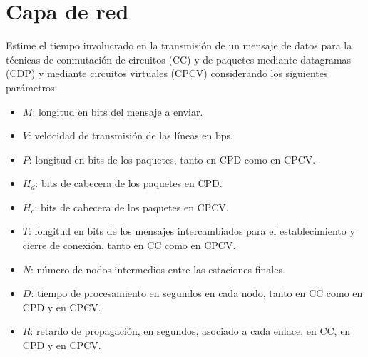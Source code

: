 \section{Capa de red}

\begin{ejercicio}
    Estime el tiempo involucrado en la transmisión de un mensaje de datos para la técnicas de conmutación de circuitos (CC) y de paquetes mediante datagramas (CDP) y mediante circuitos virtuales (CPCV) considerando los siguientes parámetros:
    \begin{itemize}
        \item $M$: longitud en bits del mensaje a enviar.
        \item $V$: velocidad de transmisión de las líneas en bps.
        \item $P$: longitud en bits de los paquetes, tanto en CPD como en CPCV\@.
        \item $H_d$: bits de cabecera de los paquetes en CPD\@.
        \item $H_c$: bits de cabecera de los paquetes en CPCV\@.
        \item $T$: longitud en bits de los mensajes intercambiados para el establecimiento y cierre de conexión, tanto en CC como en CPCV\@.
        \item $N$: número de nodos intermedios entre las estaciones finales.
        \item $D$: tiempo de procesamiento en segundos en cada nodo, tanto en CC como en CPD y en CPCV\@.
        \item $R$: retardo de propagación, en segundos, asociado a cada enlace, en CC, en CPD y en CPCV\@.
    \end{itemize}
\end{ejercicio}


